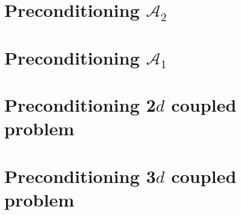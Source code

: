 \documentclass[r]{siamart171218}
\begin{document}
\section{Preconditioning $\mathcal{A}_2$}\label{sec:problem_omega}


\section{Preconditioning $\mathcal{A}_1$}\label{sec:problem_gamma}


\section{Preconditioning 2$d$ coupled problem}\label{sec:coupled2d}


\section{Preconditioning 3$d$ coupled problem}\label{sec:coupled2d}





\end{document}
